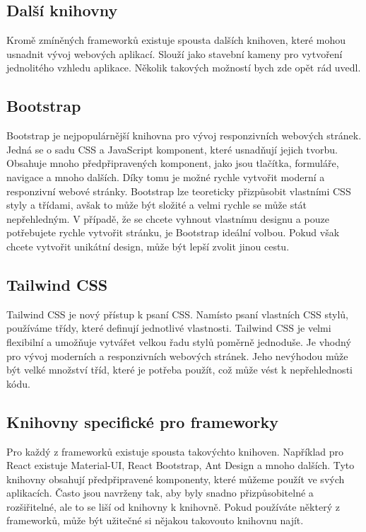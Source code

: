 \subsection{Další knihovny}
\label{sec:other-libraries}

Kromě zmíněných frameworků existuje spousta dalších knihoven, které mohou usnadnit vývoj webových aplikací. Slouží jako stavební kameny pro vytvoření jednolitého vzhledu aplikace. Několik takových možností bych zde opět rád uvedl.

\subsection*{Bootstrap}
\label{subsec:bootstrap}

Bootstrap je nejpopulárnější knihovna pro vývoj responzivních webových stránek. Jedná se o sadu CSS a JavaScript komponent, které usnadňují jejich tvorbu. Obsahuje mnoho předpřipravených komponent, jako jsou tlačítka, formuláře, navigace a mnoho dalších. Díky tomu je možné rychle vytvořit moderní a responzivní webové stránky. Bootstrap lze teoreticky přizpůsobit vlastními CSS styly a třídami, avšak to může být složité a velmi rychle se může stát nepřehledným. V případě, že se chcete vyhnout vlastnímu designu a pouze potřebujete rychle vytvořit stránku, je Bootstrap ideální volbou. Pokud však chcete vytvořit unikátní design, může být lepší zvolit jinou cestu.

\subsection*{Tailwind CSS}
\label{subsec:tailwind-css}

Tailwind CSS je nový přístup k psaní CSS. Namísto psaní vlastních CSS stylů, používáme třídy, které definují jednotlivé vlastnosti. Tailwind CSS je velmi flexibilní a umožňuje vytvářet velkou řadu stylů poměrně jednoduše. Je vhodný pro vývoj moderních a responzivních webových stránek. Jeho nevýhodou může být velké množství tříd, které je potřeba použít, což může vést k nepřehlednosti kódu.

\subsection*{Knihovny specifické pro frameworky}
\label{subsec:framework-specific-libraries}

Pro každý z frameworků existuje spousta takovýchto knihoven. Například pro React existuje Material-UI, React Bootstrap, Ant Design a mnoho dalších. Tyto knihovny obsahují předpřipravené komponenty, které můžeme použít ve svých aplikacích. Často jsou navrženy tak, aby byly snadno přizpůsobitelné a rozšiřitelné, ale to se liší od knihovny k knihovně. Pokud používáte některý z frameworků, může být užitečné si nějakou takovouto knihovnu najít.


